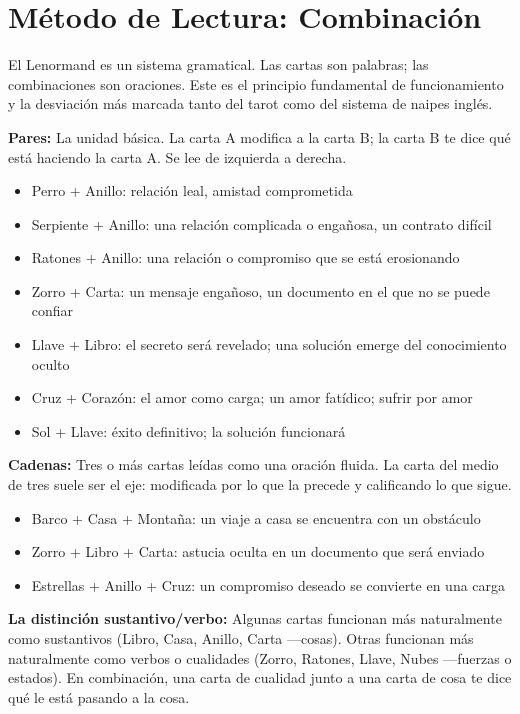 \section{Método de Lectura: Combinación}\label{reading-method-combination}

El Lenormand es un sistema gramatical. Las cartas son palabras; las combinaciones son oraciones. Este es el principio fundamental de funcionamiento y la desviación más marcada tanto del tarot como del sistema de naipes inglés.

\textbf{Pares:} La unidad básica. La carta A modifica a la carta B; la carta B te dice qué está haciendo la carta A. Se lee de izquierda a derecha.

\begin{itemize}
\tightlist
\item
  Perro + Anillo: relación leal, amistad comprometida
\item
  Serpiente + Anillo: una relación complicada o engañosa, un contrato difícil
\item
  Ratones + Anillo: una relación o compromiso que se está erosionando
\item
  Zorro + Carta: un mensaje engañoso, un documento en el que no se puede confiar
\item
  Llave + Libro: el secreto será revelado; una solución emerge del conocimiento oculto
\item
  Cruz + Corazón: el amor como carga; un amor fatídico; sufrir por amor
\item
  Sol + Llave: éxito definitivo; la solución funcionará
\end{itemize}

\textbf{Cadenas:} Tres o más cartas leídas como una oración fluida. La carta del medio de tres suele ser el eje: modificada por lo que la precede y calificando lo que sigue.

\begin{itemize}
\tightlist
\item
  Barco + Casa + Montaña: un viaje a casa se encuentra con un obstáculo
\item
  Zorro + Libro + Carta: astucia oculta en un documento que será enviado
\item
  Estrellas + Anillo + Cruz: un compromiso deseado se convierte en una carga
\end{itemize}

\textbf{La distinción sustantivo/verbo:} Algunas cartas funcionan más naturalmente como sustantivos (Libro, Casa, Anillo, Carta ---cosas). Otras funcionan más naturalmente como verbos o cualidades (Zorro, Ratones, Llave, Nubes ---fuerzas o estados). En combinación, una carta de cualidad junto a una carta de cosa te dice qué le está pasando a la cosa.

